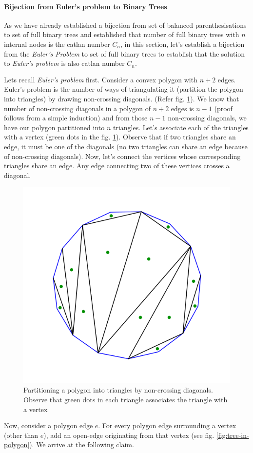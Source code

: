 
\paragraph{Bijection from Euler's problem to Binary Trees} As we have already established a bijection from set of balanced parenthesisations to set of full binary trees and established that number of full binary trees with $n$ internal nodes is the catlan number $C_n$, in this section, let's establish a bijection from the \emph{Euler's Problem} to set of full binary trees to establish that the solution to \emph{Euler's problem} is also catlan number $C_n$.

Lets recall \emph{Euler's problem} first. Consider a convex polygon with $n+2$ edges. Euler's problem is the number of ways of triangulating it (partition the polygon into triangles) by drawing non-crossing diagonals. (Refer fig. \ref{fig:Euler's-polygon}). We know that number of non-crossing diagonals in a polygon of $n+2$ edges is $n-1$ (proof follows from a simple induction) and from those $n-1$ non-crossing diagonals, we have our polygon partitioned into $n$ triangles. Let's associate each of the triangles with a vertex (green dots in the fig. \ref{fig:Euler's-polygon}). Observe that if two triangles share an edge, it must be one of the diagonals (no two triangles can share an edge because of non-crossing diagonals). Now, let's connect the vertices whose corresponding triangles share an edge. Any edge connecting two of these vertices crosses a diagonal. 
\begin{figure}[h!]
    \centering
    \includegraphics[width=0.4\linewidth]{polygon.png}
    \caption{Partitioning a polygon into triangles by non-crossing diagonals. Observe that green dots in each triangle associates the triangle with a vertex}
    \label{fig:Euler's-polygon}
\end{figure}
Now, consider a polygon edge $e$. For every polygon edge surrounding a vertex (other than $e$), add an open-edge originating from that vertex (see fig. \ref{fig:tree-in-polygon}). We arrive at the following claim.  
